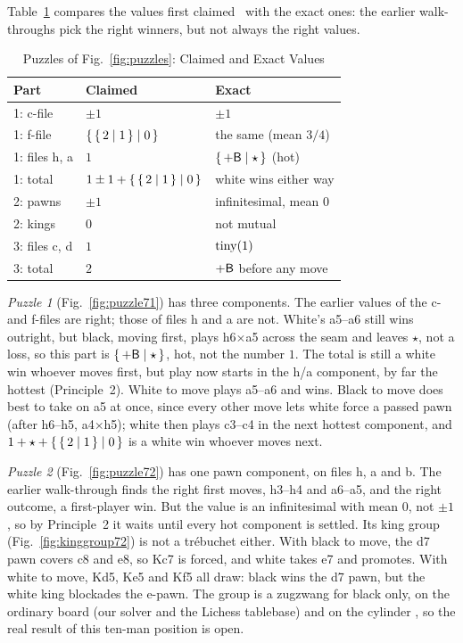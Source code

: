 Table~\ref{tab:puzzles} compares the values first claimed~\cite{Study2025} with the exact ones: the earlier
walk-throughs pick the right winners, but not always the right values.

\begin{table}[!t]
\centering
\caption{Puzzles of Fig.~\ref{fig:puzzles}: Claimed and Exact Values }
\label{tab:puzzles}
\begin{tabular}{@{}lll@{}}
\toprule
Part & Claimed~\cite{Study2025} & Exact \\
\midrule
1: c-file & $\pm1$ & $\pm1$ \\
1: f-file & $\{\,\{\,2 \mid 1\,\} \mid 0\,\}$ & the same (mean $3/4$) \\
1: files h, a & $1$ & $\{\,+\mathsf{B} \mid \star\,\}$ (hot) \\
1: total & $1\pm1+\{\,\{\,2 \mid 1\,\} \mid 0\,\}$ & white wins either way \\
2: pawns & $\pm1$ & infinitesimal, mean $0$ \\
2: kings & $0$ & not mutual \\
3: files c, d & $1$ & $\operatorname{tiny}(1)$ \\
3: total & $2$ & $+\mathsf{B}$ before any move \\
\bottomrule
\end{tabular}
\end{table}

\emph{Puzzle 1} (Fig.~\ref{fig:puzzle71}) has three components. The earlier values of the c- and f-files are right;
those of files h and a are not. White's a5--a6 still wins
outright, but black, moving first, plays h6$\times$a5 across the seam and leaves $\star$, not a loss, so this
part is $\{\,+\mathsf{B} \mid \star\,\}$, hot, not the number $1$. The total is still a white win whoever moves first, but
play now starts in the h/a component, by far the hottest (Principle~2). White to move plays a5--a6 and wins.
Black to move does best to take on a5 at once, since every other move lets white force a passed pawn (after
h6--h5, a4$\times$h5); white then plays c3--c4 in the next hottest component, and
$1+\star+\{\,\{\,2 \mid 1\,\} \mid 0\,\}$ is a white win whoever moves next.

\emph{Puzzle 2} (Fig.~\ref{fig:puzzle72}) has one pawn component, on files h, a and b. The earlier walk-through
finds the right first moves, h3--h4 and a6--a5, and the right outcome, a first-player win. But the value is an
infinitesimal with mean $0$, not $\pm1$, so by Principle~2 it waits until every hot component is settled.
Its king group (Fig.~\ref{fig:kinggroup72}) is not a tr\'ebuchet either. With black to move, the d7 pawn covers
c8 and e8, so Kc7 is forced, and white takes e7 and promotes. With white to move, Kd5, Ke5 and Kf5 all draw:
black wins the d7 pawn, but the white king blockades the e-pawn. The group is a zugzwang for black only, on the
ordinary board  (our solver and the Lichess tablebase) and on the cylinder , so the real result
of this ten-man position is open.

